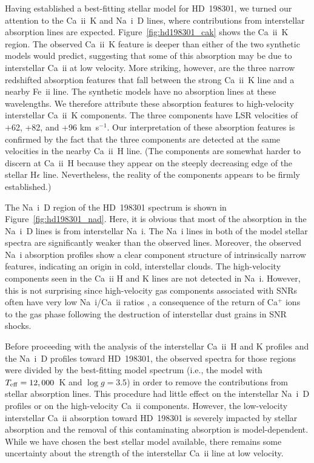 \documentclass[fleqn,usenatbib]{mnras}
\begin{document}
Having established a best-fitting stellar model for HD~198301, we turned our attention to the Ca~{\sc ii}~K and Na~{\sc i}~D lines, where contributions from interstellar absorption lines are expected. Figure~\ref{fig:hd198301_cak} shows the Ca~{\sc ii}~K region. The observed Ca~{\sc ii}~K feature is deeper than either of the two synthetic models would predict, suggesting that some of this absorption may be due to interstellar Ca~{\sc ii} at low velocity. More striking, however, are the three narrow redshifted absorption features that fall between the strong Ca~{\sc ii}~K line and a nearby Fe~{\sc ii} line. The synthetic models have no absorption lines at these wavelengths. We therefore attribute these absorption features to high-velocity interstellar Ca~{\sc ii}~K components. The three components have LSR velocities of +62, +82, and +96 km~s$^{-1}$. Our interpretation of these absorption features is confirmed by the fact that the three components are detected at the same velocities in the nearby Ca~{\sc ii}~H line. (The components are somewhat harder to discern at Ca~{\sc ii}~H because they appear on the steeply decreasing edge of the stellar H$\epsilon$ line. Nevertheless, the reality of the components appears to be firmly established.)

The Na~{\sc i}~D region of the HD~198301 spectrum is shown in Figure~\ref{fig:hd198301_nad}. Here, it is obvious that most of the absorption in the Na~{\sc i}~D lines is from interstellar Na~{\sc i}. The Na~{\sc i} lines in both of the model stellar spectra are significantly weaker than the observed lines. Moreover, the observed Na~{\sc i} absorption profiles show a clear component structure of intrinsically narrow features, indicating an origin in cold, interstellar clouds. The high-velocity components seen in the Ca~{\sc ii} H and K lines are not detected in Na~{\sc i}. However, this is not surprising since high-velocity gas components associated with SNRs often have very low Na~{\sc i}/Ca~{\sc ii} ratios \citep[e.g.,][]{ds95,sw04,r20}, a consequence of the return of Ca$^+$ ions to the gas phase following the destruction of interstellar dust grains in SNR shocks.

Before proceeding with the analysis of the interstellar Ca~{\sc ii}~H and K profiles and the Na~{\sc i}~D profiles toward HD~198301, the observed spectra for those regions were divided by the best-fitting model spectrum (i.e., the model with $T_{\rm eff}=12,000$~K and $\log g=3.5$) in order to remove the contributions from stellar absorption lines. This procedure had little effect on the interstellar Na~{\sc i}~D profiles or on the high-velocity Ca~{\sc ii} components. However, the low-velocity interstellar Ca~{\sc ii} absorption toward HD~198301 is severely impacted by stellar absorption and the removal of this contaminating absorption is model-dependent. While we have chosen the best stellar model available, there remains some uncertainty about the strength of the interstellar Ca~{\sc ii} line at low velocity.
\end{document}
